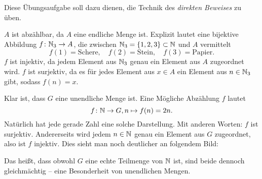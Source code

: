 \documentclass[11pt]{scrartcl}
\begin{document}
\begin{solution}
  Diese Übungsaufgabe soll dazu dienen, die Technik des \emph{direkten Beweises} zu üben.
  \begin{subex}
    \item $A$ ist abzählbar, da $A$ eine endliche Menge ist.
    Explizit lautet eine bijektive Abbildung $f\colon \mathbb{N}_3 \rightarrow A$, die zwischen $\mathbb{N}_3 = \{1, 2, 3\} \subset \mathbb{N}$ und $A$ vermittelt
    \[
      f(1) = \mathrm{Schere}, \quad f(2) = \mathrm{Stein}, \quad f(3) = \mathrm{Papier}.
    \]
  $f$ ist injektiv, da jedem Element aus $\mathbb{N}_3$ genau ein Element aus $A$ zugeordnet wird.
  $f$ ist surjektiv, da es für jedes Element aus $x \in A$ ein Element aus $n \in \mathbb{N}_3$ gibt, sodass $f(n) = x$.

  \item Klar ist, dass $G$ eine unendliche Menge ist.
  Eine Mögliche Abzählung $f$ lautet
  \[
    f\colon \mathbb{N} \rightarrow G, n \mapsto f(n) = 2n.
  \]
  Natürlich hat jede gerade Zahl eine solche Darstellung.
  Mit anderen Worten: $f$ ist surjektiv.
  Andererseits wird jedem $n \in \mathbb{N}$ genau ein Element aus $G$ zugeordnet, also ist $f$ injektiv.
  Dies sieht man noch deutlicher an folgendem Bild:

  \begin{center}
  \end{center}

  Das heißt, dass obwohl $G$ eine echte Teilmenge von $\mathbb{N}$ ist, sind beide dennoch gleichmächtig --  eine Besonderheit von unendlichen Mengen.
  \end{subex}
\end{solution}
\end{document}
